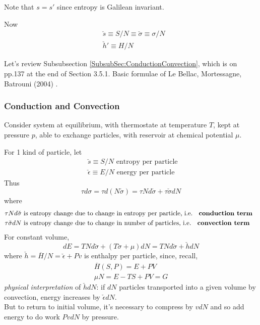 \begin{enumerate}
Note that $s=s'$ since entropy is Galilean invariant.  

Now
\[
\begin{aligned}
  & \check{s} \equiv S/N \equiv \check{\sigma} \equiv \sigma /N \\ 
  &  \check{h}' \equiv H/N
\end{aligned}
\]




Let's review Subsubsection \ref{SubsubSec:ConductionConvection}, which is on pp.137 at the end of Section 3.5.1. Basic formulae of Le Bellac, Mortessagne, Batrouni (2004) \cite{MLeBellacFMortessagneGBatrouni2004}.  

\subsubsection{Conduction and Convection}

Consider system at equilibrium, with thermostate at temperature $T$, kept at pressure $p$, able to exchange particles, with reservoir at chemical potential $\mu$.  

For 1 kind of particle, let 
\[
\begin{aligned}
  & \check{s} \equiv S/N \text{ entropy per particle } \\ 
  & \check{\epsilon} \equiv E/N \text{ energy per particle }
\end{aligned}
\]
Thus
\[
\tau d\sigma = \tau d(N \check{\sigma}) = \tau N d\check{\sigma} + \tau \check{\sigma} dN
\]
where 
\[
\begin{aligned}
  & \tau N d\check{\sigma} \text{ is entropy change due to change in entropy per particle, i.e. \textbf{ conduction term } } \\
  & \tau \check{\sigma} dN \text{ is entropy change due to change in number of particles, i.e. \textbf{ convection term } }
\end{aligned}
\]
For constant volume,
\[
dE = TN d\check{\sigma} + (T\check{\sigma} +\mu)dN = TN d\check{\sigma} + \check{h} dN
\]
where $\check{h} = \overline{H}/N = \check{\epsilon} + Pv$ is enthalpy per particle, since, recall,
\[
\begin{gathered}
  \overline{H}(S,P) = E+ PV \\ 
  \mu N = E-TS + PV =G
\end{gathered}
\]
\emph{physical interpretation} of $\check{h}dN$: if $dN$ particles transported into a given volume by convection, 
energy increases by $\check{\epsilon}dN$.  \\
 But to return to initial volume, it's necessary to compress by $vdN$ and so add energy to do work $PvdN$ by pressure.


\end{enumerate}
